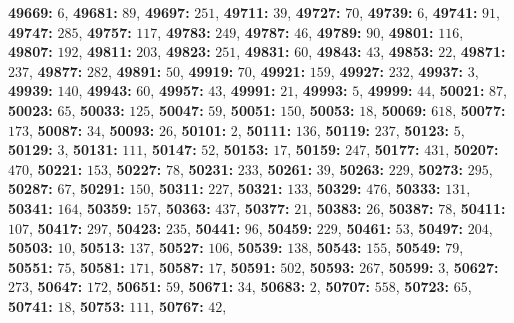\textsf{\bfseries 49669:} $6$, \textsf{\bfseries 49681:} $89$, \textsf{\bfseries 49697:} $251$, \textsf{\bfseries 49711:} $39$, \textsf{\bfseries 49727:} $70$, \textsf{\bfseries 49739:} $6$, \textsf{\bfseries 49741:} $91$, \textsf{\bfseries 49747:} $285$, \textsf{\bfseries 49757:} $117$, \textsf{\bfseries 49783:} $249$, \textsf{\bfseries 49787:} $46$, \textsf{\bfseries 49789:} $90$, \textsf{\bfseries 49801:} $116$, \textsf{\bfseries 49807:} $192$, \textsf{\bfseries 49811:} $203$, \textsf{\bfseries 49823:} $251$, \textsf{\bfseries 49831:} $60$, \textsf{\bfseries 49843:} $43$, \textsf{\bfseries 49853:} $22$, \textsf{\bfseries 49871:} $237$, \textsf{\bfseries 49877:} $282$, \textsf{\bfseries 49891:} $50$, \textsf{\bfseries 49919:} $70$, \textsf{\bfseries 49921:} $159$, \textsf{\bfseries 49927:} $232$, \textsf{\bfseries 49937:} $3$, \textsf{\bfseries 49939:} $140$, \textsf{\bfseries 49943:} $60$, \textsf{\bfseries 49957:} $43$, \textsf{\bfseries 49991:} $21$, \textsf{\bfseries 49993:} $5$, \textsf{\bfseries 49999:} $44$, \textsf{\bfseries 50021:} $87$, \textsf{\bfseries 50023:} $65$, \textsf{\bfseries 50033:} $125$, \textsf{\bfseries 50047:} $59$, \textsf{\bfseries 50051:} $150$, \textsf{\bfseries 50053:} $18$, \textsf{\bfseries 50069:} $618$, \textsf{\bfseries 50077:} $173$, \textsf{\bfseries 50087:} $34$, \textsf{\bfseries 50093:} $26$, \textsf{\bfseries 50101:} $2$, \textsf{\bfseries 50111:} $136$, \textsf{\bfseries 50119:} $237$, \textsf{\bfseries 50123:} $5$, \textsf{\bfseries 50129:} $3$, \textsf{\bfseries 50131:} $111$, \textsf{\bfseries 50147:} $52$, \textsf{\bfseries 50153:} $17$, \textsf{\bfseries 50159:} $247$, \textsf{\bfseries 50177:} $431$, \textsf{\bfseries 50207:} $470$, \textsf{\bfseries 50221:} $153$, \textsf{\bfseries 50227:} $78$, \textsf{\bfseries 50231:} $233$, \textsf{\bfseries 50261:} $39$, \textsf{\bfseries 50263:} $229$, \textsf{\bfseries 50273:} $295$, \textsf{\bfseries 50287:} $67$, \textsf{\bfseries 50291:} $150$, \textsf{\bfseries 50311:} $227$, \textsf{\bfseries 50321:} $133$, \textsf{\bfseries 50329:} $476$, \textsf{\bfseries 50333:} $131$, \textsf{\bfseries 50341:} $164$, \textsf{\bfseries 50359:} $157$, \textsf{\bfseries 50363:} $437$, \textsf{\bfseries 50377:} $21$, \textsf{\bfseries 50383:} $26$, \textsf{\bfseries 50387:} $78$, \textsf{\bfseries 50411:} $107$, \textsf{\bfseries 50417:} $297$, \textsf{\bfseries 50423:} $235$, \textsf{\bfseries 50441:} $96$, \textsf{\bfseries 50459:} $229$, \textsf{\bfseries 50461:} $53$, \textsf{\bfseries 50497:} $204$, \textsf{\bfseries 50503:} $10$, \textsf{\bfseries 50513:} $137$, \textsf{\bfseries 50527:} $106$, \textsf{\bfseries 50539:} $138$, \textsf{\bfseries 50543:} $155$, \textsf{\bfseries 50549:} $79$, \textsf{\bfseries 50551:} $75$, \textsf{\bfseries 50581:} $171$, \textsf{\bfseries 50587:} $17$, \textsf{\bfseries 50591:} $502$, \textsf{\bfseries 50593:} $267$, \textsf{\bfseries 50599:} $3$, \textsf{\bfseries 50627:} $273$, \textsf{\bfseries 50647:} $172$, \textsf{\bfseries 50651:} $59$, \textsf{\bfseries 50671:} $34$, \textsf{\bfseries 50683:} $2$, \textsf{\bfseries 50707:} $558$, \textsf{\bfseries 50723:} $65$, \textsf{\bfseries 50741:} $18$, \textsf{\bfseries 50753:} $111$, \textsf{\bfseries 50767:} $42$, 
